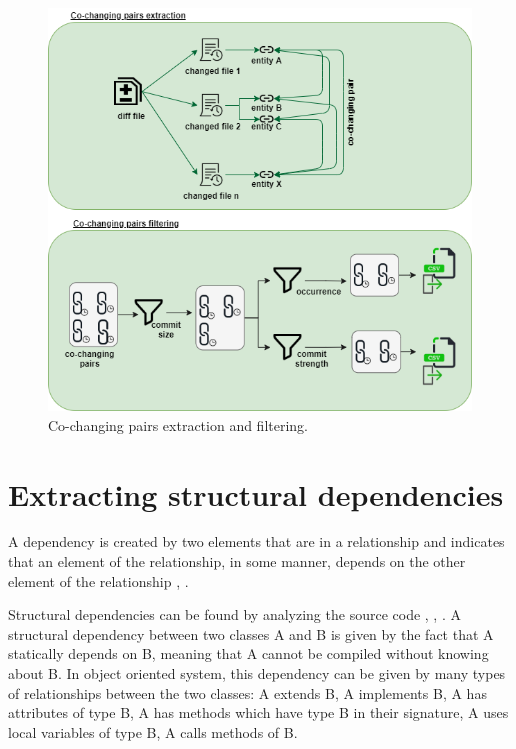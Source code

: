 \documentclass[12pt]{mitthesis}
\begin{document}
\begin{figure}[H]
\centering
\includegraphics[width=\textwidth]{pairs_filtering.png}
\caption{Co-changing pairs extraction and filtering.}
\label{fig:figfiltering}
\end{figure}


\section{Extracting structural dependencies}
\label{sec:sd_extraction}
A dependency is created by two elements that are in a relationship and indicates that an element of the relationship, in some manner, depends on the other element of the relationship \cite{Booch:2004:OAD:975416}, \cite{Cataldo2009SoftwareDW}.

Structural dependencies can be found by analyzing the source code \cite{Sangal:2005:UDM:1094811.1094824}, \cite{CalloArias2011}, \cite{structdep}. A structural dependency between two classes A and B is given by the fact that A statically depends on B, meaning that A cannot be compiled without knowing about B. In object oriented system, this dependency can be given by many types of relationships between the two classes: A extends B, A implements B, A has attributes of type B, A has methods which have type B in their signature, A uses local variables of type B, A calls methods of B.
\end{document}
